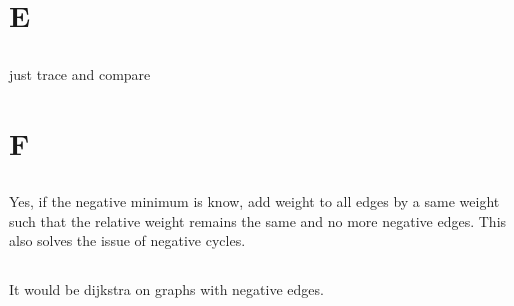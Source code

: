 \documentclass{article}
\begin{document}
\section{E}
\subsection{}
just trace and compare
\subsection{}


\section{F}
\subsection{}
Yes, if the negative minimum is know, add weight to all edges by 
a same weight such that the relative weight remains the same and no more negative edges. \newline
This also solves the issue of negative cycles.

\subsection{}
It would be dijkstra on graphs with negative edges.
\end{document}
